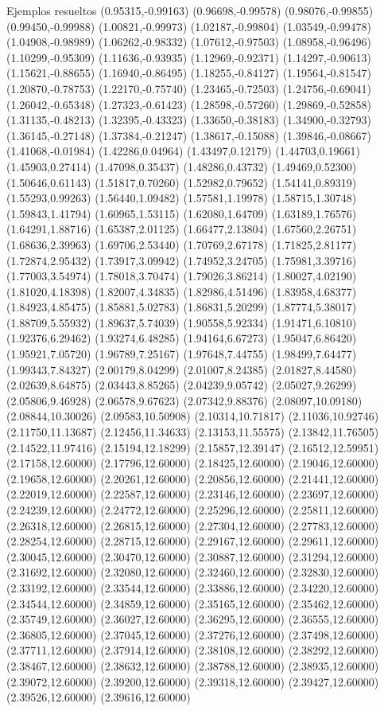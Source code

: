 \documentclass[11pt,a4paper]{article}
\begin{document}
\begin{fmex}{Ejemplos resueltos}
(0.95315,-0.99163) (0.96698,-0.99578) (0.98076,-0.99855) (0.99450,-0.99988) (1.00821,-0.99973) (1.02187,-0.99804) (1.03549,-0.99478) (1.04908,-0.98989) (1.06262,-0.98332) (1.07612,-0.97503) (1.08958,-0.96496) (1.10299,-0.95309) (1.11636,-0.93935) (1.12969,-0.92371) (1.14297,-0.90613) (1.15621,-0.88655) (1.16940,-0.86495) (1.18255,-0.84127) (1.19564,-0.81547) (1.20870,-0.78753) (1.22170,-0.75740) (1.23465,-0.72503) (1.24756,-0.69041) (1.26042,-0.65348) (1.27323,-0.61423) (1.28598,-0.57260) (1.29869,-0.52858) (1.31135,-0.48213) (1.32395,-0.43323) (1.33650,-0.38183) (1.34900,-0.32793) (1.36145,-0.27148) (1.37384,-0.21247) (1.38617,-0.15088) (1.39846,-0.08667) (1.41068,-0.01984) (1.42286,0.04964) (1.43497,0.12179) (1.44703,0.19661) (1.45903,0.27414) (1.47098,0.35437) (1.48286,0.43732) (1.49469,0.52300) (1.50646,0.61143) (1.51817,0.70260) (1.52982,0.79652) (1.54141,0.89319) (1.55293,0.99263) (1.56440,1.09482) (1.57581,1.19978) (1.58715,1.30748) (1.59843,1.41794) (1.60965,1.53115) (1.62080,1.64709) (1.63189,1.76576) (1.64291,1.88716) (1.65387,2.01125) (1.66477,2.13804) (1.67560,2.26751) (1.68636,2.39963) (1.69706,2.53440) (1.70769,2.67178) (1.71825,2.81177) (1.72874,2.95432) (1.73917,3.09942) (1.74952,3.24705) (1.75981,3.39716) (1.77003,3.54974) (1.78018,3.70474) (1.79026,3.86214) (1.80027,4.02190) (1.81020,4.18398) (1.82007,4.34835) (1.82986,4.51496) (1.83958,4.68377) (1.84923,4.85475) (1.85881,5.02783) (1.86831,5.20299) (1.87774,5.38017) (1.88709,5.55932) (1.89637,5.74039) (1.90558,5.92334) (1.91471,6.10810) (1.92376,6.29462) (1.93274,6.48285) (1.94164,6.67273) (1.95047,6.86420) (1.95921,7.05720) (1.96789,7.25167) (1.97648,7.44755) (1.98499,7.64477) (1.99343,7.84327) (2.00179,8.04299) (2.01007,8.24385) (2.01827,8.44580) (2.02639,8.64875) (2.03443,8.85265) (2.04239,9.05742) (2.05027,9.26299) (2.05806,9.46928) (2.06578,9.67623) (2.07342,9.88376) (2.08097,10.09180) (2.08844,10.30026) (2.09583,10.50908) (2.10314,10.71817) (2.11036,10.92746) (2.11750,11.13687) (2.12456,11.34633) (2.13153,11.55575) (2.13842,11.76505) (2.14522,11.97416) (2.15194,12.18299) (2.15857,12.39147) (2.16512,12.59951) (2.17158,12.60000) (2.17796,12.60000) (2.18425,12.60000) (2.19046,12.60000) (2.19658,12.60000) (2.20261,12.60000) (2.20856,12.60000) (2.21441,12.60000) (2.22019,12.60000) (2.22587,12.60000) (2.23146,12.60000) (2.23697,12.60000) (2.24239,12.60000) (2.24772,12.60000) (2.25296,12.60000) (2.25811,12.60000) (2.26318,12.60000) (2.26815,12.60000) (2.27304,12.60000) (2.27783,12.60000) (2.28254,12.60000) (2.28715,12.60000) (2.29167,12.60000) (2.29611,12.60000) (2.30045,12.60000) (2.30470,12.60000) (2.30887,12.60000) (2.31294,12.60000) (2.31692,12.60000) (2.32080,12.60000) (2.32460,12.60000) (2.32830,12.60000) (2.33192,12.60000) (2.33544,12.60000) (2.33886,12.60000) (2.34220,12.60000) (2.34544,12.60000) (2.34859,12.60000) (2.35165,12.60000) (2.35462,12.60000) (2.35749,12.60000) (2.36027,12.60000) (2.36295,12.60000) (2.36555,12.60000) (2.36805,12.60000) (2.37045,12.60000) (2.37276,12.60000) (2.37498,12.60000) (2.37711,12.60000) (2.37914,12.60000) (2.38108,12.60000) (2.38292,12.60000) (2.38467,12.60000) (2.38632,12.60000) (2.38788,12.60000) (2.38935,12.60000) (2.39072,12.60000) (2.39200,12.60000) (2.39318,12.60000) (2.39427,12.60000) (2.39526,12.60000) (2.39616,12.60000) 
\end{fmex}
\end{document}
